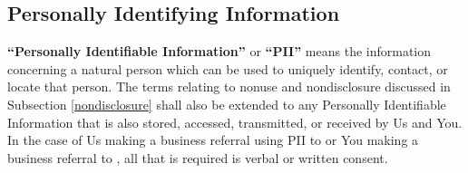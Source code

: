{    \subsection{Personally Identifying Information}
    \textbf{``Personally Identifiable Information''} or \textbf{``PII''} means the information concerning a natural person which can be used to uniquely identify, contact, or locate that person. The terms relating to nonuse and nondisclosure discussed in Subsection \ref{nondisclosure} shall also be extended to any Personally Identifiable Information that is also stored, accessed, transmitted, or received by Us and You. In the case of Us making a business referral using PII to \clientbusinessname or You making a business referral to \ludu, all that is required is verbal or written consent.
}

\newcommand{\ownershipofCI}{
\section{Ownership of Confidential Information and PII}
    You agree that no ownership of Our Confidential Information is conveyed to the You. Further, since we may require access to Your Confidential Information in order to successfully deliver the services agreed to here, You agree that any work, material, or information derived from Confidential Information or PII shall remain the sole property of Us.
}
